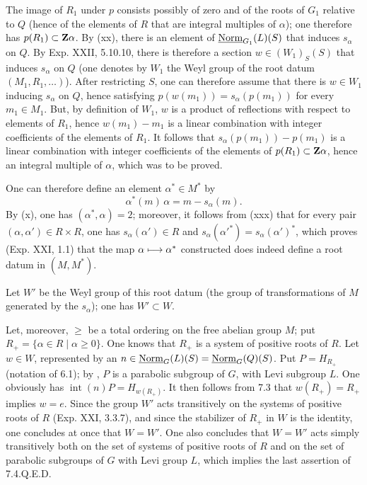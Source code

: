 The image of $R_1$ under $p$ consists possibly of zero and of the roots of $G_1$ relative to $Q$ (hence of the elements of $R$ that are integral multiples of $\alpha$); one therefore has $p(R_1)\subset\mathbf{Z}\alpha$. By (xx), there is an element of $\underline{\mathrm{Norm}}_{G_1}(L)(S)$ that induces $s_\alpha$ on $Q$. By Exp. XXII, 5.10.10, there is therefore a section $w\in(W_1)_S(S)$ that induces $s_\alpha$ on $Q$ (one denotes by $W_1$ the Weyl group of the root datum $(M_1,R_1,\ldots)$). After restricting $S$, one can therefore assume that there is $w\in W_1$ inducing $s_\alpha$ on $Q$, hence satisfying $p(w(m_1))=s_\alpha(p(m_1))$ for every $m_1\in M_1$. But, by definition of $W_1$, $w$ is a product of reflections with respect to elements of $R_1$, hence $w(m_1)-m_1$ is a linear combination with integer coefficients of the elements of $R_1$. It follows that $s_\alpha(p(m_1))-p(m_1)$ is a linear combination with integer coefficients of the elements of $p(R_1)\subset\mathbf{Z}\alpha$, hence an integral multiple of $\alpha$, which was to be proved.

\label{XXVI.7.4.4}
One can therefore define an element $\alpha^*\in M^*$ by
\[
 \alpha^*(m)\,\alpha=m-s_\alpha(m).
\]
By (x), one has $(\alpha^*,\alpha)=2$; moreover, it follows from (xxx) that for every pair $(\alpha,\alpha')\in R\times R$, one has $s_\alpha(\alpha')\in R$ and $s_\alpha(\alpha'^*)=s_\alpha(\alpha')^*$, which proves (\cf Exp. XXI, 1.1) that the map $\alpha\longmapsto\alpha^*$ constructed does indeed define a root datum in $(M,M^*)$.

\label{XXVI.7.4.5}
Let $W'$ be the Weyl group of this root datum (the group of transformations of $M$ generated by the $s_\alpha$); one has $W'\subset W$.

Let, moreover, $\geq$ be a total ordering on the free abelian group $M$; put $R_+=\{\alpha\in R\mid\alpha\geq0\}$. One knows that $R_+$ is a system of positive roots of $R$. Let $w\in W$, represented by an $n\in\underline{\mathrm{Norm}}_G(L)(S)=\underline{\mathrm{Norm}}_G(Q)(S)$. Put $P=H_{R_+}$ (notation of 6.1); by \loccit, $P$ is a parabolic subgroup of $G$, with Levi subgroup $L$.
One obviously has $\operatorname{int}(n)P=H_{w(R_+)}$. It then follows from 7.3 that $w(R_+)=R_+$ implies $w=e$. Since the group $W'$ acts transitively on the systems of positive roots of $R$ (Exp. XXI, 3.3.7), and since the stabilizer of $R_+$ in $W$ is the identity, one concludes at once that $W=W'$. One also concludes that $W=W'$ acts simply transitively both on the set of systems of positive roots of $R$ and on the set of parabolic subgroups of $G$ with Levi group $L$, which implies the last assertion of 7.4.\hfill Q.E.D.


